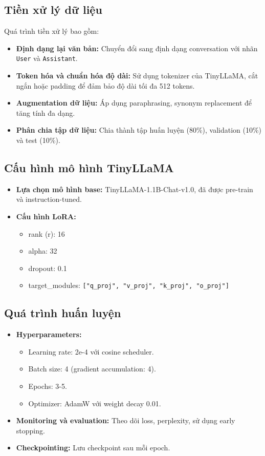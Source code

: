 \documentclass[../DoAn.tex]{subfiles}
\begin{document}
\subsection{Tiền xử lý dữ liệu}
Quá trình tiền xử lý bao gồm:
\begin{itemize}
    \item \textbf{Định dạng lại văn bản:} Chuyển đổi sang định dạng conversation với nhãn \texttt{User} và \texttt{Assistant}.
    \item \textbf{Token hóa và chuẩn hóa độ dài:} Sử dụng tokenizer của TinyLLaMA, cắt ngắn hoặc padding để đảm bảo độ dài tối đa 512 tokens.
    \item \textbf{Augmentation dữ liệu:} Áp dụng paraphrasing, synonym replacement để tăng tính đa dạng.
    \item \textbf{Phân chia tập dữ liệu:} Chia thành tập huấn luyện (80\%), validation (10\%) và test (10\%).
\end{itemize}

\subsection{Cấu hình mô hình TinyLLaMA}
\begin{itemize}
    \item \textbf{Lựa chọn mô hình base:} TinyLLaMA-1.1B-Chat-v1.0, đã được pre-train và instruction-tuned.
    \item \textbf{Cấu hình LoRA:}
    \begin{itemize}
        \item rank (r): 16
        \item alpha: 32
        \item dropout: 0.1
        \item target\_modules: \texttt{["q\_proj", "v\_proj", "k\_proj", "o\_proj"]}
    \end{itemize}
\end{itemize}

\subsection{Quá trình huấn luyện}
\begin{itemize}
    \item \textbf{Hyperparameters:}
    \begin{itemize}
        \item Learning rate: 2e-4 với cosine scheduler.
        \item Batch size: 4 (gradient accumulation: 4).
        \item Epochs: 3-5.
        \item Optimizer: AdamW với weight decay 0.01.
    \end{itemize}
    \item \textbf{Monitoring và evaluation:} Theo dõi loss, perplexity, sử dụng early stopping.
    \item \textbf{Checkpointing:} Lưu checkpoint sau mỗi epoch.
\end{itemize}
\end{document}
